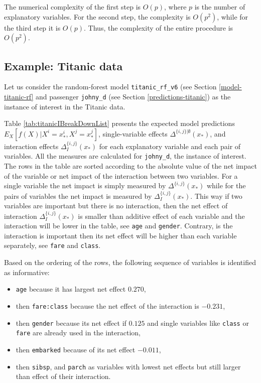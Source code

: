 \documentclass[12pt,]{krantz}
\providecommand{\tightlist}{%
  \setlength{\itemsep}{0pt}\setlength{\parskip}{0pt}}
\begin{document}
The numerical complexity of the first step is \(O(p)\), where \(p\) is the number of explanatory variables. For the second step, the complexity is \(O(p^2)\), while for the third step it is \(O(p)\). Thus, the complexity of the entire procedure is \(O(p^2)\).

\hypertarget{iBDExample}{%
\subsection{Example: Titanic data}\label{iBDExample}}

Let us consider the random-forest model \texttt{titanic\_rf\_v6} (see Section \ref{model-titanic-rf} and passenger \texttt{johny\_d} (see Section \ref{predictions-titanic}) as the instance of interest in the Titanic data.

Table \ref{tab:titanicIBreakDownList} presents the expected model predictions \(E_X[f(X)|X^i = x_*^i, X^j = x_*^j]\), single-variable effects \(\Delta^{\{i,j\}|\emptyset}(x_*)\), and interaction effects \(\Delta_{I}^{\{i,j\}}(x_*)\) for each explanatory variable and each pair of variables. All the measures are calculated for \texttt{johny\_d}, the instance of interest.
The rows in the table are sorted according to the absolute value of the net impact of the variable or net impact of the interaction between two variables. For a single variable the net impact is simply measured by \(\Delta^{\{i,j\}}(x_*)\) while for the pairs of variables the net impact is measured by \(\Delta_{I}^{\{i,j\}}(x_*)\). This way if two variables are important but there is no interaction, then the net effect of interaction \(\Delta_{I}^{\{i,j\}}(x_*)\) is smaller than additive effect of each variable and the interaction will be lower in the table, see \texttt{age} and \texttt{gender}. Contrary, is the interaction is important then its net effect will be higher than each variable separately, see \texttt{fare} and \texttt{class}.

Based on the ordering of the rows, the following sequence of variables is identified as informative:

\begin{itemize}
\tightlist
\item
  \texttt{age} because it has largest net effect \(0.270\),
\item
  then \texttt{fare:class} because the net effect of the interaction is \(-0.231\),
\item
  then \texttt{gender} because its net effect if \(0.125\) and single variables like \texttt{class} or \texttt{fare} are already used in the interaction,
\item
  then \texttt{embarked} because of its net effect \(-0.011\),
\item
  then \texttt{sibsp}, and \texttt{parch} as variables with lowest net effects but still larger than effect of their interaction.
\end{itemize}
\end{document}
